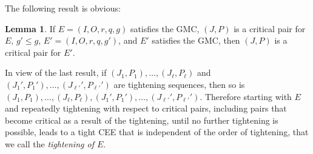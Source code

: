 \documentclass[12pt, A4paper]{article}
\theoremstyle{definition}
\newtheorem{prop}{Proposition}
\newtheorem{lem}{Lemma}
\renewcommand{\Re}{\mathbb{R}}
\begin{document}
The following result is obvious:

\begin{lem} \label{lem:criticalpair}
    If $E = (I,O,r,q,g)$ satisfies the GMC,  $(J,P)$ is a critical pair for $E$, $g' \le g$, $E' = (I,O,r,q,g')$, and $E'$ satisfies the GMC, then $(J,P)$ is a critical pair for $E'$.
\end{lem}

In view of the last result, if $(J_1,P_1), \ldots, (J_\ell,P_\ell)$ and $(J_1',P_1'), \ldots, (J_{\ell'}',P_{\ell'}')$ are tightening sequences, then so is $(J_1,P_1), \ldots, (J_\ell,P_\ell),(J_1',P_1'), \ldots, (J_{\ell'}',P_{\ell'}')$.  Therefore starting with $E$ and repeatedly tightening with respect to critical pairs, including pairs that become critical as a result of the tightening, until no further tightening is possible, leads to a tight CEE that is independent of the order of tightening, that we call the \emph{tightening of $E$}. 






\end{document}

